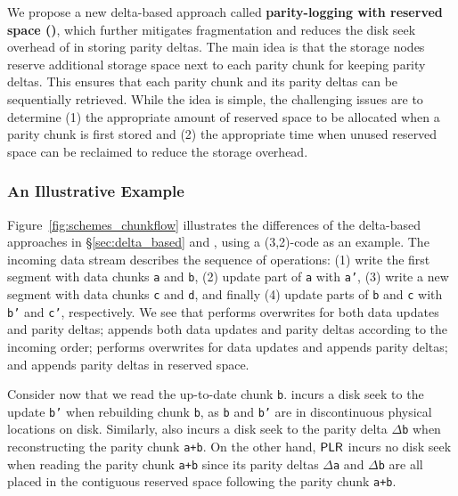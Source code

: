 We propose a new delta-based approach called {\bf parity-logging with reserved
space (\PLR)}, which further mitigates fragmentation and reduces the disk seek
overhead of \PL in storing parity deltas.  The main idea is that the storage
nodes reserve additional storage space next to each parity chunk for keeping 
parity deltas.  This ensures that each parity chunk and its parity deltas
can be sequentially retrieved. While the idea is simple, the challenging
issues are to determine (1) the appropriate amount of reserved space to be
allocated when a parity chunk is first stored and (2) the appropriate time
when unused reserved space can be reclaimed to reduce the storage overhead. 


\subsubsection{An Illustrative Example} 

Figure~\ref{fig:schemes_chunkflow} illustrates the differences of the
delta-based approaches in \S\ref{sec:delta_based} and \PLR, using a
(3,2)-code as an example.  The incoming data stream describes the sequence of
operations: (1) write the first segment with data chunks \texttt{a} and
\texttt{b}, (2) update part of \texttt{a} with \texttt{a'}, (3) write a new
segment with data chunks \texttt{c} and \texttt{d}, and finally (4) update parts
of \texttt{b} and \texttt{c} with \texttt{b'} and \texttt{c'}, respectively.  We
see that \FO performs overwrites for both data updates and parity deltas; \FL
appends both data updates and parity deltas according to the incoming order; \PL
performs overwrites for data updates and appends parity deltas; and \PLR appends
parity deltas in reserved space. 

Consider now that we read the up-to-date chunk \texttt{b}.  \FL incurs a disk
seek to the update \texttt{b'} when rebuilding chunk \texttt{b}, as 
\texttt{b} and \texttt{b'} are in discontinuous physical locations on
disk.  Similarly, \PL also incurs a disk seek to the parity delta
\texttt{$\Delta$b} when reconstructing the parity chunk \texttt{a+b}. On the
other hand,  $\textsf{PLR}$ incurs no disk seek when reading the parity chunk 
\texttt{a+b} since its parity deltas \texttt{$\Delta$a} and \texttt{$\Delta$b} are all placed
in the contiguous reserved space following the parity chunk \texttt{a+b}. 

